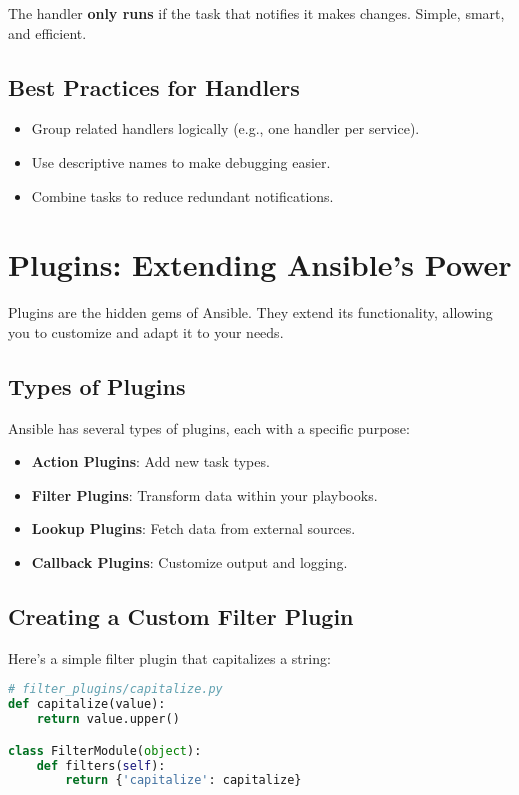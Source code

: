 The handler \textbf{only runs} if the task that notifies it makes changes. Simple, smart, and efficient.

\subsection{Best Practices for Handlers}

\begin{itemize}
    \item Group related handlers logically (e.g., one handler per service).
    \item Use descriptive names to make debugging easier.
    \item Combine tasks to reduce redundant notifications.
\end{itemize}


\section{Plugins: Extending Ansible's Power}

Plugins are the hidden gems of Ansible. They extend its functionality, allowing you to customize and adapt it to your needs.

\subsection{Types of Plugins}

Ansible has several types of plugins, each with a specific purpose:
\begin{itemize}
    \item \textbf{Action Plugins}: Add new task types.
    \item \textbf{Filter Plugins}: Transform data within your playbooks.
    \item \textbf{Lookup Plugins}: Fetch data from external sources.
    \item \textbf{Callback Plugins}: Customize output and logging.
\end{itemize}

\subsection{Creating a Custom Filter Plugin}

Here's a simple filter plugin that capitalizes a string:
\begin{lstlisting}[language=python, caption=Custom Filter Plugin Example]
# filter_plugins/capitalize.py
def capitalize(value):
    return value.upper()

class FilterModule(object):
    def filters(self):
        return {'capitalize': capitalize}
\end{lstlisting}

